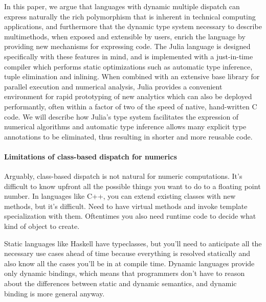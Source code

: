 \documentclass[pldi]{sigplanconf-pldi15}
\begin{document}
In this paper, we argue that languages with dynamic multiple dispatch can
express naturally the rich polymorphism that is inherent in technical computing
applications, and furthermore that the dynamic type system necessary to
describe multimethods, when exposed and extensible by users, enrich the
language by providing new mechanisms for expressing code. The Julia language
is designed specifically with these features in mind, and is implemented with a
just-in-time compiler which performs static optimizations such as automatic
type inference, tuple elimination and inlining. When combined with an extensive
base library for parallel execution and numerical analysis, Julia provides a
convenient environment for rapid prototyping of new analytics which can also be
deployed performantly, often within a factor of two of the speed of native,
hand-written C code. We will describe how Julia's type system facilitates the
expression of numerical algorithms and automatic type inference allows many
explicit type annotations to be eliminated, thus resulting in shorter and more
reusable code.

\paragraph{Limitations of class-based dispatch for numerics}
Arguably, class-based dispatch is not natural for numeric computations.  It's
difficult to know upfront all the possible things you want to do to a floating
point number.  In languages like C++, you can extend existing classes with new
methods, but it's difficult.  Need to have virtual methods and invoke template
specialization with them.  Oftentimes you also need runtime code to decide what
kind of object to create.

Static languages like Haskell have typeclasses\cite{typeclass}, but you'll need
to anticipate all the necessary use cases ahead of time because everything is
resolved statically and also know all the cases you'll be in at compile time.
Dynamic languages provide only dynamic bindings, which means that programmers
don't have to reason about the differences between static and dynamic
semantics, and dynamic binding is more general anyway.
\end{document}
